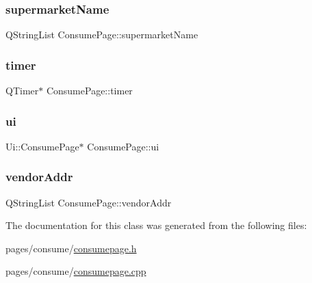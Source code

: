 \subsubsection{\texorpdfstring{supermarketName}{supermarketName}}
{\footnotesize\ttfamily Q\+String\+List Consume\+Page\+::supermarket\+Name\hspace{0.3cm}{\ttfamily [private]}}

\mbox{\label{class_consume_page_a2d862691698552503b8874e7b6ab6d78}} 
\subsubsection{\texorpdfstring{timer}{timer}}
{\footnotesize\ttfamily Q\+Timer$\ast$ Consume\+Page\+::timer\hspace{0.3cm}{\ttfamily [private]}}

\mbox{\label{class_consume_page_a985f62c214ee04ab5a32826a2c01670a}} 
\subsubsection{\texorpdfstring{ui}{ui}}
{\footnotesize\ttfamily Ui\+::\+Consume\+Page$\ast$ Consume\+Page\+::ui\hspace{0.3cm}{\ttfamily [private]}}

\mbox{\label{class_consume_page_afbdd27b55a3286494a4b5b460d7f76f6}} 
\subsubsection{\texorpdfstring{vendorAddr}{vendorAddr}}
{\footnotesize\ttfamily Q\+String\+List Consume\+Page\+::vendor\+Addr\hspace{0.3cm}{\ttfamily [private]}}



The documentation for this class was generated from the following files\+:\begin{DoxyCompactItemize}
\item 
pages/consume/\mbox{\hyperlink{consumepage_8h}{consumepage.\+h}}\item 
pages/consume/\mbox{\hyperlink{consumepage_8cpp}{consumepage.\+cpp}}\end{DoxyCompactItemize}
